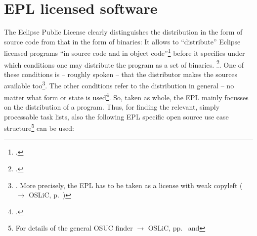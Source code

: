 %
%
%
%
%



\section{EPL licensed software}

The Eclipse Public License clearly distinguishes the distribution in the form of
source code from that in the form of binaries: It allows to \enquote{distribute}
Eclipse licensed programs \enquote{in source code and in object
code}\footcite[cf.][\nopage wp\ §3]{Epl10OsiLicense2005a} before it specifies
under which conditions one may distribute the program as a set of binaries.
\footcite[cf.][\nopage wp\ §3 top area]{Epl10OsiLicense2005a}. One of these
conditions is -- roughly spoken -- that the distributor makes the sources
available too\footnote{\cite[cf.][\nopage wp\ §3 mid
area]{Epl10OsiLicense2005a}. More precisely, the EPL has to be taken as a
license with weak copyleft ($\rightarrow$ OSLiC, p.\
\pageref{sec:ProtectingPowerOfEpl})}. The other conditions refer to the
distribution in general -- no matter what form or state is
used\footcite[cf.][\nopage wp\ §3 bottom area]{Epl10OsiLicense2005a}. So, taken
as whole, the EPL mainly focusses on the distribution of a program. Thus, for
finding the relevant, simply processable task lists, also the following EPL
specific open source use case structure\footnote{For details of the general OSUC
finder $\rightarrow$ OSLiC, pp.\ \pageref{OsucTokens} and
\pageref{OsucDefinitionTree}} can be used:
 
